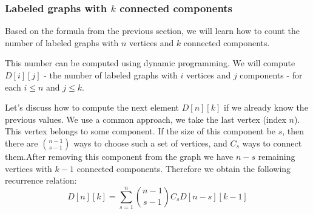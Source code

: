 \documentclass[8pt, a4paper, oneside, twocolumn]{extarticle}
\begin{document}
\subsubsection{Labeled graphs with $k$ connected components}

Based on the formula from the previous section, we will learn how to count the number of labeled graphs with $n$ vertices and $k$ connected components.

This number can be computed using dynamic programming. We will compute $D[i][j]$ - the number of labeled graphs with $i$ vertices and $j$ components - for each $i \le n$ and $j \le k$.

Let's discuss how to compute the next element $D[n][k]$ if we already know the previous values. We use a common approach, we take the last vertex (index $n$). This vertex belongs to some component. If the size of this component be $s$, then there are $\binom{n-1}{s-1}$ ways to choose such a set of vertices, and $C_s$ ways to connect them.After removing this component from the graph we have $n-s$ remaining vertices with $k-1$ connected components. Therefore we obtain the following recurrence relation: $$D[n][k] = \sum_{s=1}^{n} \binom{n-1}{s-1} C_s D[n-s][k-1]$$
\end{document}
